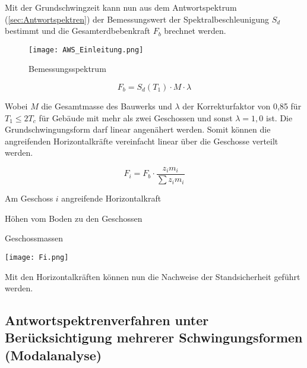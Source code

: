 Mit der Grundschwingzeit kann nun aus dem Antwortspektrum (\cref{sec:Antwortspektren}) der Bemessungswert der Spektralbeschleunigung $S_d$ bestimmt und die Gesamterdbebenkraft $F_b$ brechnet werden.

\begin{figure}[H]
    \centering
    \texttt{[image: AWS\_Einleitung.png]}
    \caption{Bemessungsspektrum}
\end{figure}

\pagebreak

\begin{equation*}
F_b = S_d(T_1) \cdot M \cdot \lambda
\end{equation*}

Wobei $M$ die Gesamtmasse des Bauwerks und $\lambda$ der Korrekturfaktor von 0,85 für $T_1 \leq 2T_c$ für Gebäude mit mehr als zwei Geschossen und sonst $\lambda=1,0$ ist.
Die Grundschwingungsform darf linear angenähert werden. Somit können die angreifenden Horizontalkräfte vereinfacht linear über die Geschosse verteilt werden.

\begin{minipage}{0.6\textwidth}

\begin{equation*}
F_i = F_b \cdot \frac{z_i m_i}{\sum z_i m_i}
\end{equation*}

\vspace{2ex}
\vspace{2ex}

  Am Geschoss $i$ angreifende Horizontalkraft\par
{}  Höhen vom Boden zu den Geschossen\par
{}  Geschossmassen\par

\end{minipage}%
\hfill
\begin{minipage}{0.4\textwidth}

\begin{flushright}
\texttt{[image: Fi.png]}
\end{flushright}

\end{minipage}%

Mit den Horizontalkräften können nun die Nachweise der Standsicherheit geführt werden.

\subsection{Antwortspektrenverfahren unter Berücksichtigung mehrerer Schwingungsformen (Modalanalyse)}
\label{sec:Modalanalyse}

